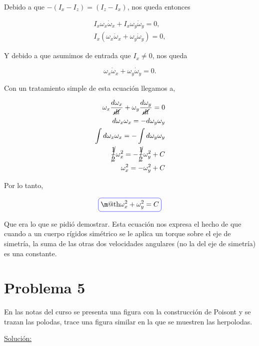 \documentclass[a4paper,10pt]{article}
\makeatletter
\numberwithin{equation}{section}
\newcommand*{\boxcolor}{blue}
\renewcommand{\boxed}[1]{\textcolor{\boxcolor}{%
\tikz[baseline={([yshift=-1ex]current bounding box.center)}] \node [rectangle, minimum width=1ex,rounded corners,draw] {\normalcolor\m@th$\displaystyle#1$};}}
\makeatother
\begin{document}
Debido a que $-(I_x - I_z) = (I_z - I_x)$, nos queda entonces 

\begin{align*}
 I_x \omega_x \dot{\omega}_x + I_x \omega_y \dot{\omega}_y = 0, \\
 I_x (\omega_x \dot{\omega}_x + \omega_y \dot{\omega}_y) = 0,
\end{align*}

Y debido a que asumimos de entrada que $I_x \ne 0$, nos queda 

\begin{equation}
 \omega_x \dot{\omega}_x + \omega_y \dot{\omega}_y = 0.
\end{equation}

Con un tratamiento simple de esta ecuación llegamos a,

\begin{align}
\begin{split}
\omega_x \frac{d\omega_x}{\cancel{dt}} + \omega_y \frac{d\omega_y}{\cancel{dt}} = 0 \\
%
d\omega_x \omega_x = - d\omega_y \omega_y \\
%
\int d\omega_x \omega_x = - \int d\omega_y \omega_y \\
%
\cancel{\frac{1}{2}} \omega_x^2 = - \cancel{\frac{1}{2}} \omega_y^2 + C \\
%
 \omega_x^2 = - \omega_y^2 + C
%
\end{split}
\end{align}

Por lo tanto,

\begin{equation}
 \boxed{\omega_x^2 + \omega_y^2 = C}
\end{equation}

Que era lo que se pidió demostrar. Esta ecuación nos expresa el hecho de que cuando 
a un cuerpo rígidos simétrico se le aplica un torque sobre el eje de simetría, la suma de las
otras dos velocidades angulares (no la del eje de simetría) es una constante.


\section{Problema 5}

En las notas del curso se presenta una figura con la construcción de Poisont y se 
trazan las polodas, trace una figura similar en la que se muestren las herpolodas.

\vspace{.3cm}

\underline{Solución:} \vspace{.3cm}
\end{document}
